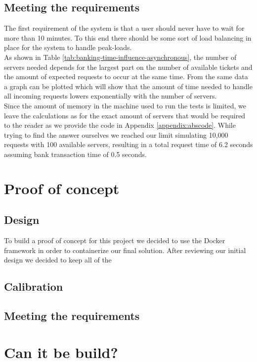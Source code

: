 \documentclass[10pt,a4paper,twocolumn]{article}
\begin{document}
\subsection{Meeting the requirements}
The first requirement of the system is that a user should never have to wait for more than 10 minutes. To this end there should be some sort of load balancing in place for the system to handle peak-loads.\\
As shown in Table \ref{tab:banking-time-influence-asynchronous}, the number of servers needed depends for the largest part on the number of available tickets and the amount of expected requests to occur at the same time. From the same data a graph can be plotted which will show that the amount of time needed to handle all incoming requests lowers exponentially with the number of servers. \\
Since the amount of memory in the machine used to run the tests is limited, we leave the calculations as for the exact amount of servers that would be required to the reader as we provide the code in Appendix \ref{appendix:abscode}. While trying to find the answer ourselves we reached our limit simulating 10,000 requests with 100 available servers, resulting in a total request time of 6.2 seconds assuming bank transaction time of 0.5 seconds.

\section{Proof of concept}
\subsection{Design}
To build a proof of concept for this project we decided to use the Docker framework in order to containerize our final solution. After reviewing our initial design we decided to keep all of the 

\subsection{Calibration}

\subsection{Meeting the requirements}

\section{Can it be build?}
\end{document}
